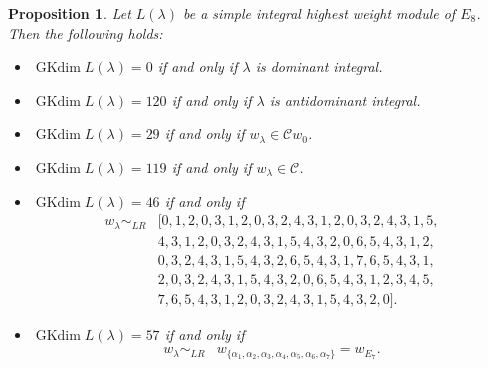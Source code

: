 \documentclass[reqno,12pt]{amsart}
\numberwithin{equation}{section}
\theoremstyle{plain}
\newtheorem{Prop}[Thm]{Proposition}
\theoremstyle{definition}
\newcommand{\lam}{\lambda}
\newcommand{\gkd}{\operatorname{GKdim}}
\begin{document}
\begin{Prop}\label{E8}
Let $L(\lam)$ be a simple integral highest weight module of $E_8$. Then
    the following holds:
    \begin{itemize}
        \item[(1)] $\gkd L(\lambda)=0$ if and only if $\lambda$ is dominant integral.
         \item[(2)] $\gkd L(\lambda)=120$ if and only if  $\lambda$ is antidominant integral.  
        \item[(3)] $\gkd L(\lambda)=29$ if and only if $w_{\lambda}\in\mathcal{C}w_0$.
       \item[(4)] $\gkd L(\lambda)=119$ if and only if $w_{\lambda}\in \mathcal{C}$.

\item[(5)] $\gkd L(\lambda)=46$ if and only if \begin{align*}
          w_{\lambda}\sim_{LR} &  
      [0, 1, 2, 0, 3, 1, 2, 0, 3, 2, 4, 3, 1, 2, 0, 3, 2, 4, 3, 1,5,\\
      & 4, 3, 1, 2, 0, 3, 2, 4, 3, 1, 5, 4, 3, 2, 0, 6, 5, 4, 3, 1, 2,\\
      & 0, 3, 2, 4, 3, 1, 5, 4, 3, 2, 6, 5, 4, 3, 1, 7, 6, 5, 4, 3, 1, \\
      &2, 0, 3, 2, 4, 3, 1, 5, 4, 3, 2, 0, 6, 5, 4, 3, 1, 2, 3, 4, 5, \\
      &7, 6, 5, 4, 3, 1, 2, 0, 3, 2, 4, 3, 1, 5, 4, 3, 2, 0].
\end{align*}







    
 \item[(6)] $\gkd L(\lambda)=57$ if and only if \begin{align*}
          w_{\lambda}\sim_{LR}&w_{\{\alpha_1,\alpha_2,\alpha_3,\alpha_4,\alpha_5,\alpha_6,\alpha_7\}}=w_{E_7}.
      \end{align*}    


\end{itemize}
\end{Prop}
\end{document}
